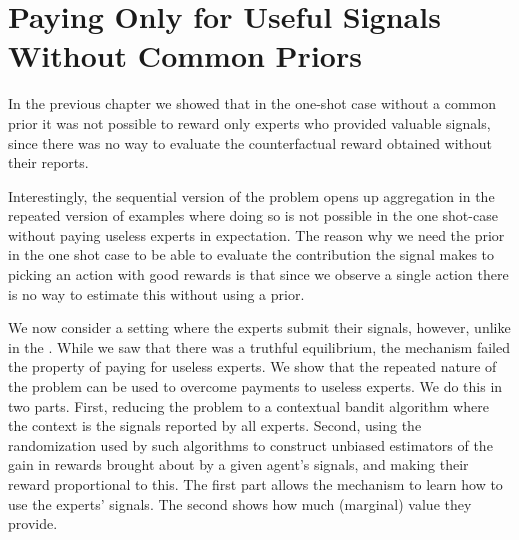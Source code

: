 




\section{Paying Only for Useful Signals Without Common Priors}

In the previous chapter we showed that in the one-shot case without a common prior it was not possible to reward only experts who provided valuable signals, since there was no way to evaluate the counterfactual reward obtained without their reports. 

Interestingly, the sequential version of the problem opens up aggregation in the repeated version of examples where doing so is not possible in the one shot-case without paying useless experts in expectation.
The reason why we need the prior in the one shot case to be able to evaluate the contribution the signal makes to picking an action with good rewards is that since we observe a single action there is no way to estimate this without using a prior. 

We now consider a setting where the experts submit their signals, however, unlike in the .
While we saw that there was a truthful equilibrium, the mechanism failed the property of paying for useless experts. We show that the repeated nature of the problem can be used to overcome payments to useless experts. 
We do this in two parts. First, reducing the problem to a contextual bandit algorithm where the context is the signals reported by all experts. Second, using the randomization used by such algorithms to construct unbiased estimators of the gain in rewards brought about by a given agent's signals, and making their reward proportional to this.
The first part allows the mechanism to learn how to use the experts' signals. The second shows how much (marginal) value they provide.

